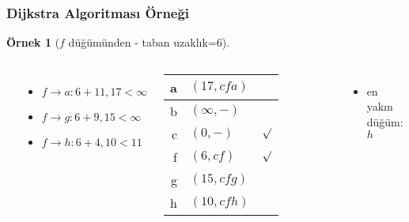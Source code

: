 \documentclass[dvipsnames]{beamer}
\theoremstyle{definition}
\theoremstyle{example}
\newtheorem{ornek}[theorem]{Örnek}
\theoremstyle{plain}
\begin{document}
\begin{frame}
  \frametitle{Dijkstra Algoritması Örneği}

  \begin{ornek}[$f$ düğümünden - taban uzaklık=$6$]
    \begin{columns}
      \begin{center}
      \end{center}

      \begin{itemize}
        \item $f \rightarrow a: 6+11, 17 < \infty$
        \item $f \rightarrow g: 6+9, 15 < \infty$
        \item $f \rightarrow h: 6+4, 10 < 11$
      \end{itemize}

      \pause
      \begin{table}
        \begin{tabular}{r|l|c}
          a & $(17,cfa)$   & \\\hline
          b & $(\infty,-)$ & \\\hline
          c & $(0,-)$      & $\surd$ \\\hline
          f & $(6,cf)$     & $\surd$ \\\hline
          g & $(15,cfg)$   & \\\hline
          h & $(10,cfh)$   &
        \end{tabular}
      \end{table}

      \pause
      \begin{itemize}
        \item en yakın düğüm: $h$
      \end{itemize}
    \end{columns}
  \end{ornek}
\end{frame}
\end{document}

